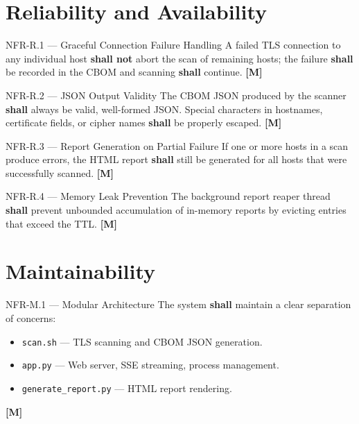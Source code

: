 \section{Reliability and Availability}
\label{sec:reliability}

\begin{reqbox}{NFR-R.1 — Graceful Connection Failure Handling}
  A failed TLS connection to any individual host \textbf{shall not} abort the
  scan of remaining hosts; the failure \textbf{shall} be recorded in the CBOM
  and scanning \textbf{shall} continue. \hfill \textbf{[M]}
\end{reqbox}

\begin{reqbox}{NFR-R.2 — JSON Output Validity}
  The CBOM JSON produced by the scanner \textbf{shall} always be valid,
  well-formed JSON. Special characters in hostnames, certificate fields, or
  cipher names \textbf{shall} be properly escaped. \hfill \textbf{[M]}
\end{reqbox}

\begin{reqbox}{NFR-R.3 — Report Generation on Partial Failure}
  If one or more hosts in a scan produce errors, the HTML report
  \textbf{shall} still be generated for all hosts that were successfully
  scanned. \hfill \textbf{[M]}
\end{reqbox}

\begin{reqbox}{NFR-R.4 — Memory Leak Prevention}
  The background report reaper thread \textbf{shall} prevent unbounded
  accumulation of in-memory reports by evicting entries that exceed the TTL.
  \hfill \textbf{[M]}
\end{reqbox}

\section{Maintainability}
\label{sec:maintainability}

\begin{reqbox}{NFR-M.1 — Modular Architecture}
  The system \textbf{shall} maintain a clear separation of concerns:
  \begin{itemize}[noitemsep]
    \item \texttt{scan.sh} — TLS scanning and CBOM JSON generation.
    \item \texttt{app.py} — Web server, SSE streaming, process management.
    \item \texttt{generate\_report.py} — HTML report rendering.
  \end{itemize}
  \hfill \textbf{[M]}
\end{reqbox}

